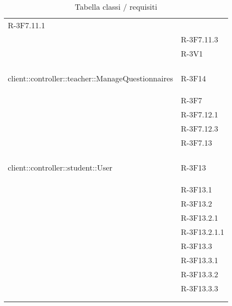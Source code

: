 \begin{longtable}{l p{3cm}}
R-3F7.11.1 \tabularnewline &

R-3F7.11.3 \tabularnewline &

R-3V1 \tabularnewline &\tabularnewline
\midrule
\hypertarget{client::controller::teacher::ManageQuestionnaires}{client::controller::teacher::ManageQuestionnaires} & R-3F14 \tabularnewline &

R-3F7 \tabularnewline &

R-3F7.12.1 \tabularnewline &

R-3F7.12.3 \tabularnewline &

R-3F7.13 \tabularnewline &\tabularnewline
\midrule
\hypertarget{client::controller::student::User}{client::controller::student::User} & R-3F13 \tabularnewline &

R-3F13.1 \tabularnewline &

R-3F13.2 \tabularnewline &

R-3F13.2.1 \tabularnewline &

R-3F13.2.1.1 \tabularnewline &

R-3F13.3 \tabularnewline &

R-3F13.3.1 \tabularnewline &

R-3F13.3.2 \tabularnewline &

R-3F13.3.3 \tabularnewline &\tabularnewline
\midrule
\caption{Tabella classi / requisiti} \tabularnewline
\end{longtable}
